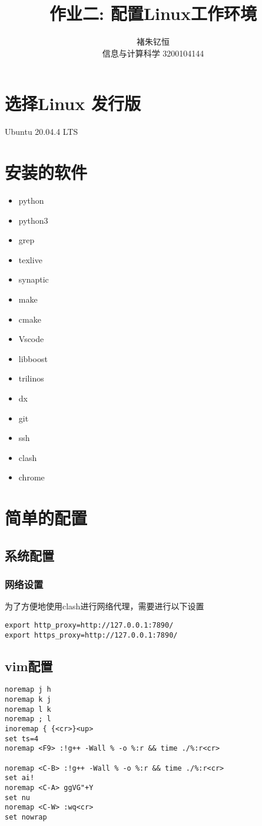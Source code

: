 \documentclass{article}
\title{作业二: 配置Linux工作环境}
\author{褚朱钇恒 \\ 信息与计算科学 3200104144}
\begin{document}
\maketitle

\section{选择Linux 发行版}
    Ubuntu 20.04.4 LTS
\section{安装的软件}
    \begin{itemize}
        \item python
        \item python3
        \item grep
        \item texlive
        \item synaptic
        \item make
        \item cmake
        \item Vscode
        \item libboost
        \item trilinos
        \item dx
        \item git
        \item ssh
        \item clash
        \item chrome
    \end{itemize}
\section{简单的配置}
    \subsection{系统配置}
        \subsubsection{网络设置}
        为了方便地使用clash进行网络代理，需要进行以下设置\cite{GlaDOS}
            \begin{verbatim}
export http_proxy=http://127.0.0.1:7890/
export https_proxy=http://127.0.0.1:7890/
            \end{verbatim}
        \subsection{vim配置}
            \begin{verbatim}
noremap j h
noremap k j
noremap l k
noremap ; l
inoremap { {<cr>}<up>
set ts=4
noremap <F9> :!g++ -Wall % -o %:r && time ./%:r<cr>

noremap <C-B> :!g++ -Wall % -o %:r && time ./%:r<cr>
set ai!
noremap <C-A> ggVG"+Y
set nu
noremap <C-W> :wq<cr>
set nowrap
            \end{verbatim}
\end{document}
